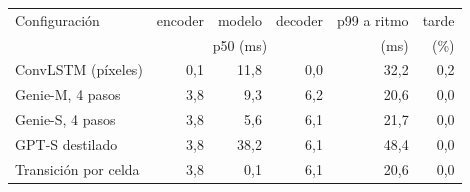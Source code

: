 \begin{tabular}{lrrrrr}
\toprule
Configuración & encoder & modelo & decoder & p99 a ritmo & tarde \\
 & \multicolumn{3}{c}{p50 (ms)} & (ms) & (\%) \\
\midrule
ConvLSTM (píxeles) & 0{,}1 & 11{,}8 & 0{,}0 & 32{,}2 & 0{,}2 \\
Genie-M, 4 pasos & 3{,}8 & 9{,}3 & 6{,}2 & 20{,}6 & 0{,}0 \\
Genie-S, 4 pasos & 3{,}8 & 5{,}6 & 6{,}1 & 21{,}7 & 0{,}0 \\
GPT-S destilado & 3{,}8 & 38{,}2 & 6{,}1 & 48{,}4 & 0{,}0 \\
Transición por celda & 3{,}8 & 0{,}1 & 6{,}1 & 20{,}6 & 0{,}0 \\
\bottomrule
\end{tabular}
